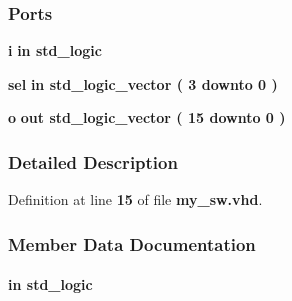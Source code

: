 \subsubsection*{Ports}
 \begin{DoxyCompactItemize}
\item 
{\bf i}  {\bfseries {\bfseries \textcolor{keywordflow}{in}\textcolor{vhdlchar}{ }}} {\bfseries \textcolor{comment}{std\+\_\+logic}\textcolor{vhdlchar}{ }} 
\item 
{\bf sel}  {\bfseries {\bfseries \textcolor{keywordflow}{in}\textcolor{vhdlchar}{ }}} {\bfseries \textcolor{comment}{std\+\_\+logic\+\_\+vector}\textcolor{vhdlchar}{ }\textcolor{vhdlchar}{(}\textcolor{vhdlchar}{ }\textcolor{vhdlchar}{ } \textcolor{vhdldigit}{3} \textcolor{vhdlchar}{ }\textcolor{keywordflow}{downto}\textcolor{vhdlchar}{ }\textcolor{vhdlchar}{ } \textcolor{vhdldigit}{0} \textcolor{vhdlchar}{ }\textcolor{vhdlchar}{)}\textcolor{vhdlchar}{ }} 
\item 
{\bf o}  {\bfseries {\bfseries \textcolor{keywordflow}{out}\textcolor{vhdlchar}{ }}} {\bfseries \textcolor{comment}{std\+\_\+logic\+\_\+vector}\textcolor{vhdlchar}{ }\textcolor{vhdlchar}{(}\textcolor{vhdlchar}{ }\textcolor{vhdlchar}{ } \textcolor{vhdldigit}{15} \textcolor{vhdlchar}{ }\textcolor{keywordflow}{downto}\textcolor{vhdlchar}{ }\textcolor{vhdlchar}{ } \textcolor{vhdldigit}{0} \textcolor{vhdlchar}{ }\textcolor{vhdlchar}{)}\textcolor{vhdlchar}{ }} 
\end{DoxyCompactItemize}


\subsubsection{Detailed Description}


Definition at line {\bf 15} of file {\bf my\+\_\+sw.\+vhd}.



\subsubsection{Member Data Documentation}
\paragraph[{i}]{ {\bfseries \textcolor{keywordflow}{in}\textcolor{vhdlchar}{ }} {\bfseries \textcolor{comment}{std\+\_\+logic}\textcolor{vhdlchar}{ }} \hspace{0.3cm}{\ttfamily [Port]}}\label{classmy__sw_a608fcdf363618ab996e1811aa186efd3}


